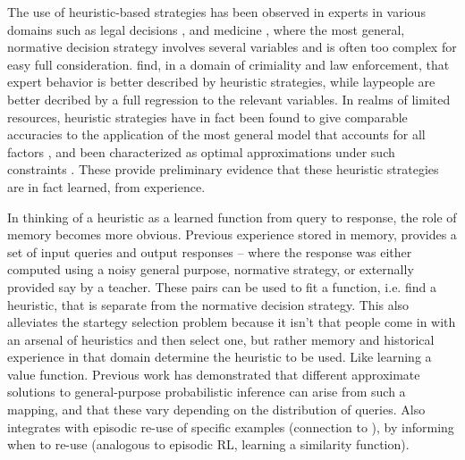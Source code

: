 The use of heuristic-based strategies has been observed in experts in various domains such as legal decisions \citep{dhami2001bailing}, and medicine \citep{reyna2006physician}, where the most general, normative decision strategy involves several variables and is often too complex for easy full consideration. \cite{garcia2009take} find, in a domain of crimiality and law enforcement, that expert behavior is better described by heuristic strategies, while laypeople are better decribed by a full regression to the relevant variables.  In realms of limited resources, heuristic strategies have in fact been found to give comparable accuracies to the application of the most general model that accounts for all factors \citep{gigerenzer2011heuristic}, and been characterized as optimal approximations under such constraints \citep{belousov2016catching, parpart2018heuristics}. These provide preliminary evidence that these heuristic strategies are in fact learned, from experience. 



In thinking of a heuristic as a learned function from query to response, the role of memory becomes more obvious. Previous experience stored in memory, provides a set of input queries and output responses -- where the response was either computed using a noisy general purpose, normative strategy, or externally provided say by a teacher. These pairs can be used to fit a function, i.e. find a heuristic, that is separate from the normative decision strategy. This also alleviates the startegy selection problem because it isn't that people come in with an arsenal of heuristics and then select one, but rather memory and historical experience in that domain determine the heuristic to be used. Like learning a value function. Previous work \citep{gluck1988conditioning, dasgupta2019theory, shanks1991connectionist} has demonstrated that different approximate solutions to general-purpose probabilistic inference can arise from such a mapping, and that these vary depending on the distribution of queries. Also integrates with episodic re-use of specific examples (connection to \cite{dasgupta2018remembrance}), by informing when to re-use (analogous to episodic RL, learning a similarity function).



